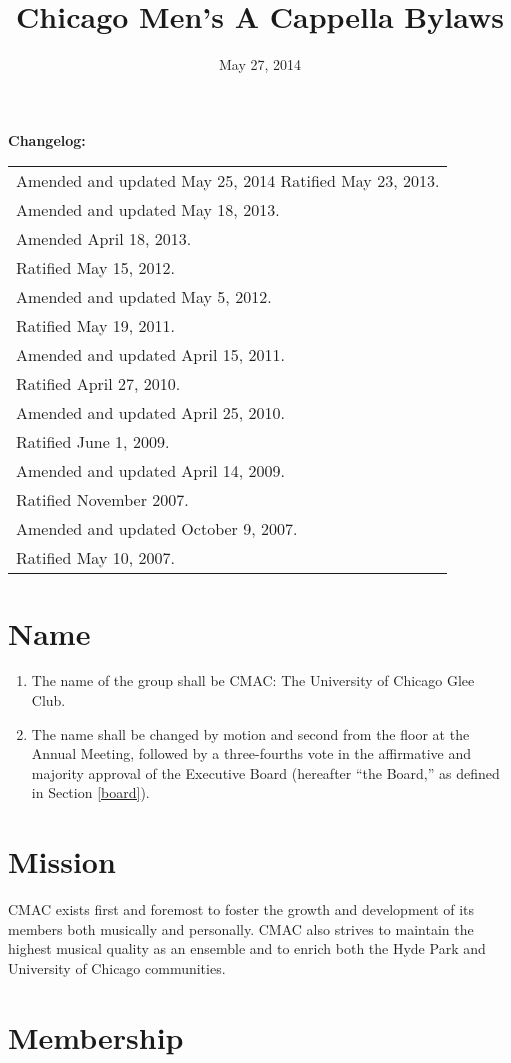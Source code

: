 \documentclass{article}
\title{Chicago Men's A Cappella Bylaws}
\date{May 27, 2014}
\providecommand{\tabularnewline}{\\}
\begin{document}
\maketitle

\noindent \textbf{Changelog:} \\
\begin{tabular}{l}
Amended and updated May 25, 2014
Ratified May 23, 2013. \tabularnewline
Amended and updated May 18, 2013. \tabularnewline
Amended April 18, 2013. \tabularnewline
Ratified May 15, 2012. \tabularnewline
Amended and updated May 5, 2012. \tabularnewline
Ratified May 19, 2011. \tabularnewline
Amended and updated April 15, 2011. \tabularnewline
Ratified April 27, 2010. \tabularnewline
Amended and updated April 25, 2010. \tabularnewline
Ratified June 1, 2009. \tabularnewline
Amended and updated April 14, 2009. \tabularnewline
Ratified November 2007. \tabularnewline
Amended and updated October 9, 2007. \tabularnewline
Ratified May 10, 2007. \tabularnewline
\end{tabular}

\noindent \newpage{}

\tableofcontents{}

\newpage{}
\section{Name}
\begin{enumerate}
\item The name of the group shall be CMAC: The University of Chicago Glee Club.
\item The name shall be changed by motion and second from the floor at the
Annual Meeting, followed by a three-fourths vote in the affirmative
and majority approval of the Executive Board (hereafter ``the Board,'' as
defined in Section \ref{board}).
\end{enumerate}

\section{Mission}

CMAC exists first and foremost to foster the growth and development
of its members both musically and personally. CMAC also strives to
maintain the highest musical quality as an ensemble and to enrich
both the Hyde Park and University of Chicago communities.

\section{Membership} \label{membership}
\end{document}
